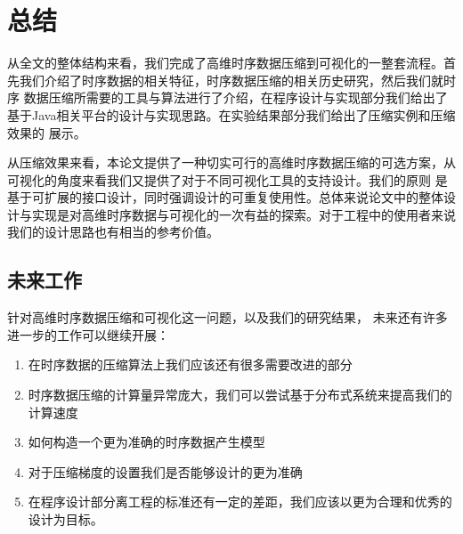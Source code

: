 
\chapter{总结}
\label{Chapter 6}

从全文的整体结构来看，我们完成了高维时序数据压缩到可视化的一整套流程。首先我们介绍了时序数据的相关特征，时序数据压缩的相关历史研究，然后我们就时序
数据压缩所需要的工具与算法进行了介绍，在程序设计与实现部分我们给出了基于Java相关平台的设计与实现思路。在实验结果部分我们给出了压缩实例和压缩效果的
展示。

从压缩效果来看，本论文提供了一种切实可行的高维时序数据压缩的可选方案，从可视化的角度来看我们又提供了对于不同可视化工具的支持设计。我们的原则
是基于可扩展的接口设计，同时强调设计的可重复使用性。总体来说论文中的整体设计与实现是对高维时序数据与可视化的一次有益的探索。对于工程中的使用者来说我们的设计思路也有相当的参考价值。

\section{未来工作}
\label{Section 6.1}

针对高维时序数据压缩和可视化这一问题，以及我们的研究结果，
未来还有许多进一步的工作可以继续开展：
\begin{enumerate}[(1)]
	\item 在时序数据的压缩算法上我们应该还有很多需要改进的部分
	\item 时序数据压缩的计算量异常庞大，我们可以尝试基于分布式系统来提高我们的计算速度
	\item 如何构造一个更为准确的时序数据产生模型
	\item 对于压缩梯度的设置我们是否能够设计的更为准确
	\item 在程序设计部分离工程的标准还有一定的差距，我们应该以更为合理和优秀的设计为目标。
\end{enumerate}

